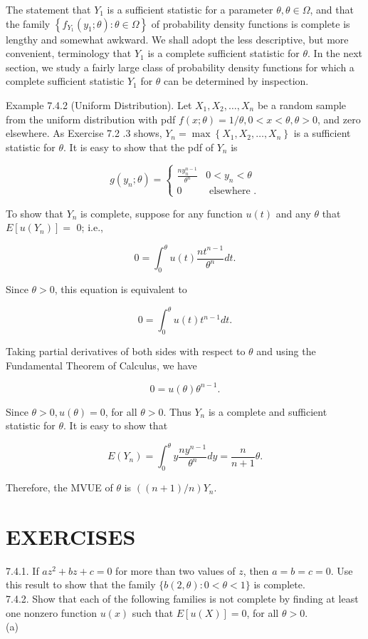 The statement that $Y_{1}$ is a sufficient statistic for a parameter $\theta, \theta \in \Omega$, and that the family $\left\{f_{Y_{1}}\left(y_{1} ; \theta\right): \theta \in \Omega\right\}$ of probability density functions is complete is lengthy and somewhat awkward. We shall adopt the less descriptive, but more convenient, terminology that $Y_{1}$ is a complete sufficient statistic for $\theta$. In the next section, we study a fairly large class of probability density functions for which a complete sufficient statistic $Y_{1}$ for $\theta$ can be determined by inspection.

Example 7.4.2 (Uniform Distribution). Let $X_{1}, X_{2}, \ldots, X_{n}$ be a random sample from the uniform distribution with pdf $f(x ; \theta)=1 / \theta, 0<x<\theta, \theta>0$, and zero elsewhere. As Exercise 7.2 .3 shows, $Y_{n}=\max \left\{X_{1}, X_{2}, \ldots, X_{n}\right\}$ is a sufficient statistic for $\theta$. It is easy to show that the pdf of $Y_{n}$ is

\[
g\left(y_{n} ; \theta\right)= \begin{cases}\frac{n y_{n}^{n-1}}{\theta^{n}} & 0<y_{n}<\theta  \tag{7.4.1}\\ 0 & \text { elsewhere } .\end{cases}
\]

To show that $Y_{n}$ is complete, suppose for any function $u(t)$ and any $\theta$ that $E\left[u\left(Y_{n}\right)\right]=$ 0; i.e.,

$$
0=\int_{0}^{\theta} u(t) \frac{n t^{n-1}}{\theta^{n}} d t .
$$

Since $\theta>0$, this equation is equivalent to

$$
0=\int_{0}^{\theta} u(t) t^{n-1} d t .
$$

Taking partial derivatives of both sides with respect to $\theta$ and using the Fundamental Theorem of Calculus, we have

$$
0=u(\theta) \theta^{n-1} .
$$

Since $\theta>0, u(\theta)=0$, for all $\theta>0$. Thus $Y_{n}$ is a complete and sufficient statistic for $\theta$. It is easy to show that

$$
E\left(Y_{n}\right)=\int_{0}^{\theta} y \frac{n y^{n-1}}{\theta^{n}} d y=\frac{n}{n+1} \theta .
$$

Therefore, the MVUE of $\theta$ is $((n+1) / n) Y_{n}$.

\section*{EXERCISES}
7.4.1. If $a z^{2}+b z+c=0$ for more than two values of $z$, then $a=b=c=0$. Use this result to show that the family $\{b(2, \theta): 0<\theta<1\}$ is complete.\\
7.4.2. Show that each of the following families is not complete by finding at least one nonzero function $u(x)$ such that $E[u(X)]=0$, for all $\theta>0$.\\
(a)

